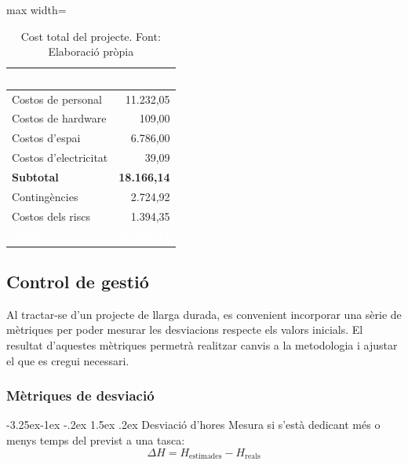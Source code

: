 \documentclass[11pt,a4paper]{report}
\makeatletter
\renewcommand\paragraph{\@startsection{paragraph}{4}{\z@}%
    {-3.25ex\@plus -1ex \@minus -.2ex}%
    {1.5ex \@plus .2ex}
    {\normalfont\normalsize\bfseries}}
\makeatother
\begin{document}
\begin{table}[H]
    \centering
    \small
    \renewcommand{\arraystretch}{2}
    \begin{adjustbox}{max width=\textwidth}
    \begin{tabular}{|l|r|}
        \hline
        \rowcolor{oceanblue}
        \textcolor{white}{\textbf{Concepte}} &
        \textcolor{white}{\textbf{Cost (€)}} \\
        \hline
        Costos de personal      & 11.232,05 \\
        \hline
        Costos de hardware             &    109,00 \\
        \hline
        Costos d'espai                    &  6.786,00 \\
        \hline
        Costos d'electricitat      &     39,09 \\
        \hline
        \rowcolor{gray!20}
        \textbf{Subtotal}                                        & \textbf{18.166,14} \\
        \hline
        Contingències             &  2.724,92 \\
        \hline
        Costos dels riscs                 &  1.394,35 \\
        \hline
        \rowcolor{oceanblue}
        \textcolor{white}{\textbf{Total}} &
        \textcolor{white}{\textbf{22.285,41}} \\
        \hline
    \end{tabular}
    \end{adjustbox}
    \caption[Cost total del projecte]{Cost total del projecte. Font: Elaboració pròpia}
    \label{tab:cost_total}
\end{table}

\subsection{Control de gestió}

Al tractar-se d'un projecte de llarga durada, es convenient incorporar una sèrie de mètriques per poder mesurar les desviacions respecte els valors inicials. El resultat d'aquestes mètriques permetrà realitzar canvis a la metodologia i ajustar el que es cregui necessari.

\subsubsection{Mètriques de desviació}

\paragraph{Desviació d'hores}
Mesura si s'està dedicant més o menys temps del previst a una tasca:
\begin{equation}
    \Delta H = H_{\text{estimades}} - H_{\text{reals}}
    \label{eq:desv_hores}
\end{equation}
\end{document}
